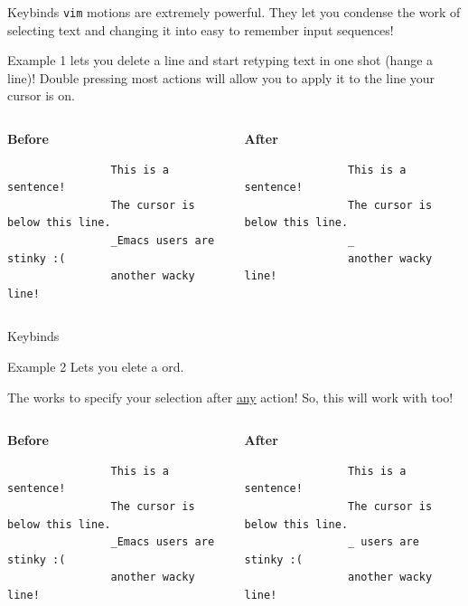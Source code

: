 \documentclass{beamer}
\begin{document}
\begin{frame}[fragile]{Keybinds}
	\texttt{vim} motions are extremely powerful. They let you condense the
	work of selecting text and changing it into easy to remember input
	sequences!
	\pause

	\begin{exampleblock}{Example 1}
		 lets you delete a line and start retyping text in one
		shot (hange a line)! Double pressing most actions will
		allow you to apply it to the line your cursor is on.
		\pause

		\bigskip

		\begin{columns}
			\begin{column}{0.5\textwidth}
				\textbf{Before}
				\begin{verbatim}
				This is a sentence!
				The cursor is below this line.
				_Emacs users are stinky :(
				another wacky line!
				\end{verbatim}
			\end{column}
			\begin{column}{0.5\textwidth}
				\textbf{After}
				\begin{verbatim}
				This is a sentence!
				The cursor is below this line.
				_
				another wacky line!
				\end{verbatim}
			\end{column}
		\end{columns}
	\end{exampleblock}
\end{frame}

\begin{frame}[fragile]{Keybinds}
	\begin{exampleblock}{Example 2}
		 Lets you elete a \keys{w}ord.
		\pause

		The  works to specify your selection after
		\underline{any} action! So, this will work with  too!
		\pause

		\medskip

		\begin{columns}
			\begin{column}{0.5\textwidth}
				\textbf{Before}
				\begin{verbatim}
				This is a sentence!
				The cursor is below this line.
				_Emacs users are stinky :(
				another wacky line!
				\end{verbatim}
			\end{column}
			\begin{column}{0.5\textwidth}
				\textbf{After}
				\begin{verbatim}
				This is a sentence!
				The cursor is below this line.
				_ users are stinky :(
				another wacky line!
				\end{verbatim}
			\end{column}
		\end{columns}
	\end{exampleblock}
\end{frame}
\end{document}
